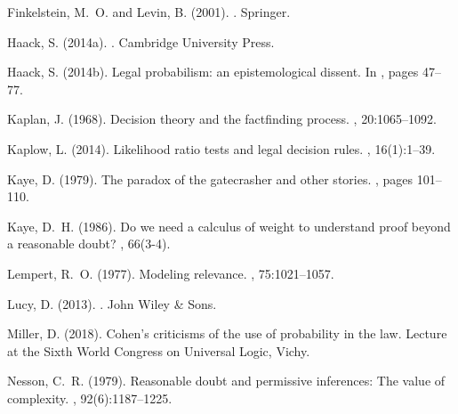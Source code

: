 \documentclass{ifcolog}
\begin{document}
\begin{thebibliography}{}
Finkelstein, M.~O. and Levin, B. (2001).
.
\newblock Springer.

Haack, S. (2014a).
.
\newblock Cambridge University Press.

Haack, S. (2014b).
\newblock Legal probabilism: an epistemological dissent.
\newblock In {\em \cite{Haack2014-HAAEMS}}, pages 47--77.

Kaplan, J. (1968).
\newblock Decision theory and the factfinding process.
, 20:1065--1092.

Kaplow, L. (2014).
\newblock Likelihood ratio tests and legal decision rules.
, 16(1):1--39.

Kaye, D. (1979).
\newblock The paradox of the gatecrasher and other stories.
, pages 101--110.

Kaye, D.~H. (1986).
\newblock Do we need a calculus of weight to understand proof beyond a
  reasonable doubt?
, 66(3-4).

Lempert, R.~O. (1977).
\newblock Modeling relevance.
, 75:1021--1057.

Lucy, D. (2013).
.
\newblock John Wiley \& Sons.

Miller, D. (2018).
\newblock Cohen's criticisms of the use of probability in the law.
\newblock Lecture at the {S}ixth {W}orld {C}ongress on {U}niversal {L}ogic,
  Vichy.

Nesson, C.~R. (1979).
\newblock Reasonable doubt and permissive inferences: The value of complexity.
, 92(6):1187--1225.


\end{thebibliography}
\end{document}
